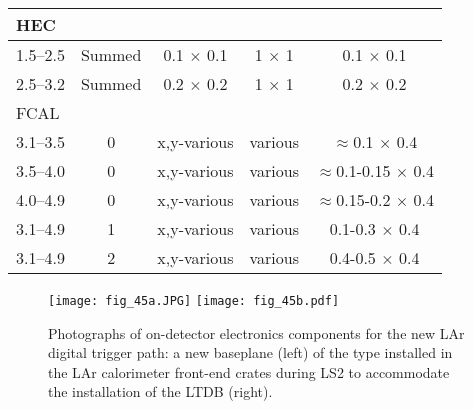 \documentclass[cernpreprint, atlasdraft=false, UKenglish,british,orcidlogo, texmf, orcidlogo]{atlasdoc}
\begin{document}
\begin{table}[p]
\begin{center}
\begin{tabular}{|c|c||c||c|c|}
\hline
\multicolumn{5}{|l|}{\gls{HEC}} \\ \hline
1.5--2.5  & Summed &  0.1 $\times$ 0.1 & 1 $\times$ 1 & 0.1 $\times$ 0.1\\
2.5--3.2 & Summed & 0.2 $\times$ 0.2 & 1 $\times$ 1 & 0.2 $\times$ 0.2  \\
\hline
\multicolumn{5}{|l|}{\gls{FCAL}} \\ \hline
3.1--3.5  & 0 & x,y-various & various & $\approx$0.1 $\times$ 0.4\\
3.5--4.0  & 0 & x,y-various & various & $\approx$0.1-0.15 $\times$ 0.4\\
4.0--4.9  & 0 & x,y-various & various & $\approx$0.15-0.2 $\times$ 0.4\\
3.1--4.9 & 1 & x,y-various & various & 0.1-0.3 $\times$ 0.4  \\
3.1--4.9 & 2 & x,y-various & various & 0.4-0.5 $\times$ 0.4  \\
 
 
\hline
\end{tabular}
\end{center}
\end{table}
 
 
 
 
 
 
\begin{figure}[t]
\begin{center}
\texttt{[image: fig\_45a.JPG]}
\texttt{[image: fig\_45b.pdf]}
\end{center}
\caption{Photographs of on-detector electronics components for the new \gls{LAr} digital trigger path: a new baseplane (left) of the type installed in the \gls{LAr} calorimeter front-end crates during \gls{LS2} to accommodate the installation of the \gls{LTDB} (right).}
\label{fig:larLTDB}
\end{figure}
 
\end{document}
